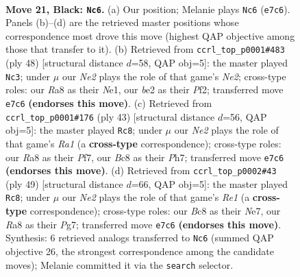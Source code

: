 \documentclass[11pt]{article}
\begin{document}
\clearpage

\begin{figure}[p]\centering
\begin{subfigure}{0.46\textwidth}\centering
\resizebox{\linewidth}{!}{%
\newchessgame
\chessboard[
  setfen={r1b3k1/p1ppn3/1p5p/5pp1/8/1PN2PP1/P1PPBK1P/R7 b - - 1 21},
  showmover=false,
  pgfstyle=straightmove, color=movearrow, markmove={e7-c6}
]}
\caption{}
\end{subfigure}\hfill
\begin{subfigure}{0.46\textwidth}\centering
\resizebox{\linewidth}{!}{%
\newchessgame
\chessboard[
  setfen={2n3k1/p4ppp/1p2p3/n2p4/3P4/4P2P/PP2NPP1/4N1K1 w - - 0 25},
  showmover=false,
  pgfstyle=straightmove, color=movearrow, markmove={e2-c3}
]}
\caption{}
\end{subfigure}
\\[4pt]
\begin{subfigure}{0.46\textwidth}\centering
\resizebox{\linewidth}{!}{%
\newchessgame
\chessboard[
  setfen={r3k3/5p1p/p3b1p1/B1ppn3/8/1PN1P3/P4PPP/R5K1 b - - 2 22},
  showmover=false,
  pgfstyle=straightmove, color=movearrow, markmove={a8-c8}
]}
\caption{}
\end{subfigure}\hfill
\begin{subfigure}{0.46\textwidth}\centering
\resizebox{\linewidth}{!}{%
\newchessgame
\chessboard[
  setfen={4r1k1/1p2npp1/1B2b2p/3p4/1P2p3/2P4P/2P2PP1/R4BK1 b - - 0 25},
  showmover=false,
  pgfstyle=straightmove, color=movearrow, markmove={e8-c8}
]}
\caption{}
\end{subfigure}
\caption{\textbf{Move 21, Black: \texttt{Nc6}.} (a) Our position; Melanie plays \texttt{Nc6} (\texttt{e7c6}). Panels (b)--(d) are the retrieved master positions whose correspondence most drove this move (highest QAP objective among those that transfer to it). (b) Retrieved from \texttt{ccrl\_top\_p0001\#483} (ply 48) [structural distance $d$=58, QAP obj=5]: the master played \texttt{Nc3}; under $\mu$ our \emph{Ne2} plays the role of that game's \emph{Ne2}; cross-type roles: our \emph{R}a8 as their \emph{N}e1, our \emph{b}e2 as their \emph{P}f2; transferred move \texttt{e7c6} \textbf{(endorses this move)}. (c) Retrieved from \texttt{ccrl\_top\_p0001\#176} (ply 43) [structural distance $d$=56, QAP obj=5]: the master played \texttt{Rc8}; under $\mu$ our \emph{Ne2} plays the role of that game's \emph{Ra1} (a \textbf{cross-type} correspondence); cross-type roles: our \emph{R}a8 as their \emph{P}f7, our \emph{B}c8 as their \emph{P}h7; transferred move \texttt{e7c6} \textbf{(endorses this move)}. (d) Retrieved from \texttt{ccrl\_top\_p0002\#43} (ply 49) [structural distance $d$=66, QAP obj=5]: the master played \texttt{Rc8}; under $\mu$ our \emph{Ne2} plays the role of that game's \emph{Re1} (a \textbf{cross-type} correspondence); cross-type roles: our \emph{B}c8 as their \emph{N}e7, our \emph{R}a8 as their \emph{P}g7; transferred move \texttt{e7c6} \textbf{(endorses this move)}. Synthesis: 6 retrieved analogs transferred to \texttt{Nc6} (summed QAP objective 26, the strongest correspondence among the candidate moves); Melanie committed it via the \texttt{search} selector.}
\label{fig:thought-m41}
\end{figure}
\end{document}
